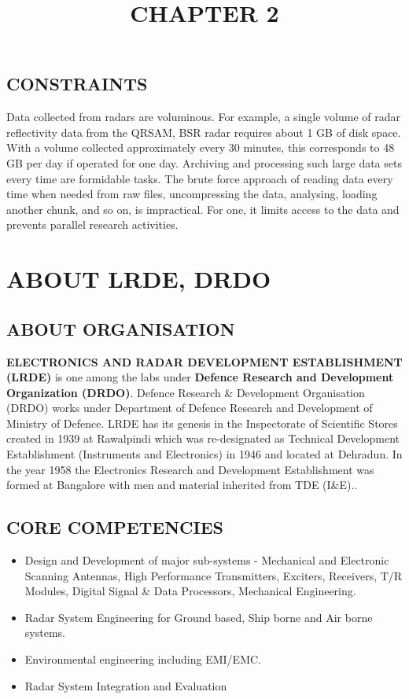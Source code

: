 \documentclass[14pt]{article} %
\begin{document}
\subsection{CONSTRAINTS}
Data collected from radars are voluminous. For example, a single volume of radar reflectivity data from the QRSAM, BSR radar requires about   1 GB of disk space. With a volume collected approximately every 30 minutes, this corresponds to 48 GB per day if operated for one day. Archiving and processing such large data sets every time are formidable tasks. The brute force approach of reading data every time when needed from raw files, uncompressing the data, analysing, loading another chunk, and so on, is impractical. For one, it limits access to the data and prevents parallel research activities.

\pagebreak

\title{CHAPTER 2}
\maketitle
\section{ABOUT LRDE, DRDO}

\subsection{ABOUT ORGANISATION}
\textbf{ELECTRONICS AND RADAR DEVELOPMENT ESTABLISHMENT (LRDE)} is one among the labs under \textbf{ Defence Research and Development Organization (DRDO)}. Defence Research \& Development Organisation (DRDO) works under Department of Defence Research and Development of Ministry of Defence. LRDE has its genesis in the Inspectorate of Scientific Stores created in 1939 at  Rawalpindi which was re-designated as Technical Development Establishment (Instruments and Electronics) in 1946 and located at Dehradun. In the year 1958 the Electronics Research and Development Establishment was formed at Bangalore with men and material inherited from TDE (I\&E).. 

\subsection{CORE COMPETENCIES}
\begin{itemize}
 \item	Design and Development of major sub-systems - Mechanical and Electronic Scanning Antennas, High Performance Transmitters, Exciters, Receivers, T/R Modules, Digital Signal \& Data Processors, Mechanical Engineering.
\item	Radar System Engineering for Ground based, Ship borne and Air borne systems.
\item	Environmental engineering including EMI/EMC.
\item	Radar System Integration and Evaluation
\end{itemize}
\end{document}
